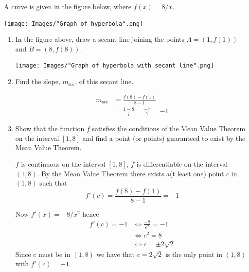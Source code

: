 \documentclass[nooutcomes]{ximera}
\begin{document}
\begin{problem}
  A curve is given in the figure below, where $f(x) = 8/x$.
  \begin{image}
     \texttt{[image: Images/"Graph of hyperbola".png]}
  \end{image}
  \begin{enumerate}
    \item

      In the figure above, draw a secant line joining the points $A = (1, f(1))$ and $B = (8, f(8))$.
        \begin{image}
     \texttt{[image: Images/"Graph of hyperbola with secant line".png]}
  \end{image}
     \item
      Find the slope, $m_{\text{sec}}$, of this secant line.
      \begin{freeResponse}
        \begin{align*}
          m_{\text{sec}} &= \frac{f(8) - f(1)}{8 - 1} \\
                        &= \frac{1 - 8}{7} = \frac{-7}{7} = -1
        \end{align*}
      \end{freeResponse}

    \item
      Show that the function $f$ satisfies the conditions of the Mean Value Theorem on the interval $[1, 8]$ and find a point (or points) guaranteed to exist by the Mean Value Theorem.
      \begin{freeResponse}
        $f$ is continuous on the interval $[1, 8]$, $f$ is differentiable on the interval $(1, 8)$.
        By the Mean Value Theorem there exists a(t least one) point $c$ in $(1, 8)$ such that
        \[
          f'(c) = \frac{f(8) - f(1)}{8 - 1} = -1
        \]

        Now $f'(x) = -8/x^2$ hence
        \begin{align*}
          f'(c) = -1 &\iff \frac{-8}{c^2} = -1 \\
                     &\iff c^2 = 8 \\
                     &\iff c= \pm 2\sqrt{2}
        \end{align*}
        Since $c$ must be in $(1, 8)$ we have that $c = 2\sqrt{2}$ is the only point in $(1, 8)$ with $f'(c) = -1$.
      \end{freeResponse}

  \end{enumerate}
\end{problem}
\end{document}
